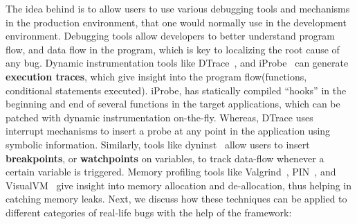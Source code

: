The idea behind \parikshan is to allow users to use various debugging tools and mechanisms in the production environment, that one would normally use in the development environment.
Debugging tools allow developers to better understand program flow, and data flow in the program, which is key to localizing the root cause of any bug.
Dynamic instrumentation tools like DTrace~\cite{dtrace}, and iProbe~\cite{iProbe} can generate \textbf{execution traces}, which give insight into the program flow(functions, conditional statements executed).
iProbe, has statically compiled ``hooks'' in the beginning and end of several functions in the target applications, which can be patched with dynamic instrumentation on-the-fly.
Whereas, DTrace uses interrupt mechanisms to insert a probe at any point in the application using symbolic information. 
Similarly, tools like dyninst~\cite{dyninst} allow users to insert \textbf{breakpoints}, or \textbf{watchpoints} on variables, to track data-flow whenever a certain variable is triggered.
Memory profiling tools like Valgrind~\cite{valgrind}, PIN~\cite{pin}, and VisualVM~\cite{visualvm} give insight into memory allocation and de-allocation, thus helping in catching memory leaks.
Next, we discuss how these techniques can be applied to different categories of real-life bugs with the help of the \parikshan framework:


